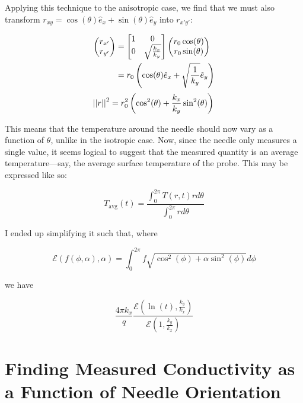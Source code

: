 Applying this technique to the anisotropic case, we find that we must also transform \(r_{xy} = \cos(\theta) \hat{e}_x + \sin(\theta) \hat{e}_y \) into \(r_{x'y'}\):

\begin{align*}
    \begin{pmatrix}r_{x'} \\ r_{y'}\end{pmatrix} &=
    \begin{bmatrix}1 & 0\\ 0 & \sqrt{\frac{k_x}{k_y}} \end{bmatrix}\begin{pmatrix}r_0\cos(\theta) \\ r_0\sin(\theta)\end{pmatrix}\\
    &= r_0\left(\cos(\theta) \hat{e}_x + \sqrt{\frac1{k_y}} \hat{e}_y \right)\\
\end{align*}
\begin{equation}
    \left|\left|{r}\right|\right|^2 = r_0^2 \left(\cos^2(\theta) + \frac{k_x}{k_y}\sin^2(\theta) \right)\\
\end{equation}

This means that the temperature around the needle should now vary as a function of \(\theta\), unlike in the isotropic case. Now, since the needle only measures a single value, it seems logical to suggest that the measured quantity is an average temperature---say, the average surface temperature of the probe.  This may be expressed like so:

\begin{equation}
T_{\textrm{avg}}(t) = \frac{ \int_0^{2\pi} T(r,t) rd\theta }
                           { \int_0^{2\pi} rd\theta}
\end{equation}

I ended up simplifying it such that, where

\begin{equation}
\mathcal{E}(f(\phi, \alpha), \alpha) = \int_0^{2\pi} f\sqrt{\cos^2(\phi) + \alpha\sin^2(\phi)} d\phi
\end{equation}

we have

\begin{equation}
\frac{4\pi k_x}{q} \frac{\mathcal{E}(\ln(t), \frac{k_y}{k_x})}{\mathcal{E}(1, \frac{k_y}{k_x})}
\end{equation}

\section{Finding Measured Conductivity as a Function of Needle Orientation}
